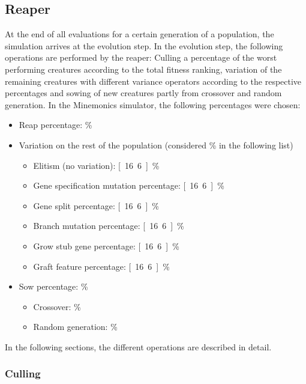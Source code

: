 \documentclass[main]{subfiles}
\begin{document}
\subsection{Reaper}
\label{subsection:Reaper}

At the end of all evaluations for a certain generation of a population, the simulation arrives at the evolution step.  In the evolution step, the following operations are performed by the reaper: Culling a percentage of the worst performing creatures according to the total fitness ranking, variation of the remaining creatures with different variance operators according to the respective percentages and sowing of new creatures partly from crossover and random generation. In the Minemonics simulator, the following percentages were chosen:

\begin{itemize}
\item Reap percentage: \unit[15]{\%}
\item Variation on the rest of the population (considered \unit[100]{\%} in the following list)
\begin{itemize}
\item Elitism (no variation): \unit[16.6]{\%}
\item Gene specification mutation percentage: \unit[16.6]{\%}
\item Gene split percentage: \unit[16.6]{\%}
\item Branch mutation percentage: \unit[16.6]{\%}
\item Grow stub gene percentage: \unit[16.6]{\%}
\item Graft feature percentage: \unit[16.6]{\%}
\end{itemize}
\item Sow percentage: \unit[15]{\%}
\begin{itemize}
\item Crossover: \unit[50]{\%}
\item Random generation: \unit[50]{\%}
\end{itemize}
\label{item:ReaperPerc}
\end{itemize}

In the following sections, the different operations are described in detail.

\subsubsection{Culling}
\label{subsubsection:Culling}
\end{document}

